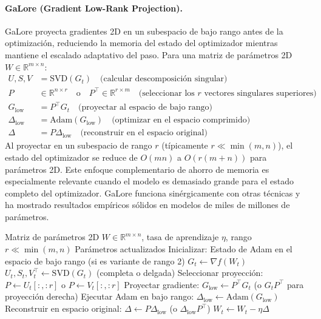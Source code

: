 \paragraph{GaLore (Gradient Low-Rank Projection).}
GaLore proyecta gradientes 2D en un subespacio de bajo rango antes de la optimización, reduciendo la memoria del estado del optimizador mientras mantiene el escalado adaptativo del paso. Para una matriz de parámetros 2D $W \in \mathbb{R}^{m \times n}$:
\begin{align}
U, S, V &= \text{SVD}(G_t) \quad\text{(calcular descomposición singular)} \\
P &\in \mathbb{R}^{n \times r} \quad\text{o} \quad P^\top \in \mathbb{R}^{r \times m} \quad\text{(seleccionar los $r$ vectores singulares superiores)} \\
G_{\text{low}} &= P^\top G_t \quad\text{(proyectar al espacio de bajo rango)} \\
\Delta_{\text{low}} &= \text{Adam}(G_{\text{low}}) \quad\text{(optimizar en el espacio comprimido)} \\
\Delta &= P \Delta_{\text{low}} \quad\text{(reconstruir en el espacio original)}
\end{align}
Al proyectar en un subespacio de rango $r$ (típicamente $r \ll \min(m,n)$), el estado del optimizador se reduce de $O(mn)$ a $O(r(m+n))$ para parámetros 2D. Este enfoque complementario de ahorro de memoria es especialmente relevante cuando el modelo es demasiado grande para el estado completo del optimizador. GaLore funciona sinérgicamente con otras técnicas y ha mostrado resultados empíricos sólidos en modelos de miles de millones de parámetros.

\begin{algorithm}[H]
\caption{GaLore (Gradient Low-Rank Projection)}
\label{alg:galore}
\begin{algorithmic}[1]
\Require Matriz de parámetros 2D $W \in \mathbb{R}^{m \times n}$, tasa de aprendizaje $\eta$, rango $r \ll \min(m,n)$
\Ensure Parámetros actualizados
\State Inicializar: Estado de Adam en el espacio de bajo rango (si es variante de rango 2)
    \State $G_t \gets \nabla f(W_t)$
      
        \State $U_t, S_t, V_t^\top \gets \text{SVD}(G_t)$ (completa o delgada)
        \State Seleccionar proyección: $P \gets U_t[:, :r]$ o $P \gets V_t[:, :r]$
    \EndIf
    \State Proyectar gradiente: $G_{\text{low}} \gets P^\top G_t$ (o $G_t P^\top$ para proyección derecha)
    \State Ejecutar Adam en bajo rango: $\Delta_{\text{low}} \gets \text{Adam}(G_{\text{low}})$
    \State Reconstruir en espacio original: $\Delta \gets P \Delta_{\text{low}}$ (o $\Delta_{\text{low}} P^\top$)
    \State $W_t \gets W_t - \eta \Delta$
\EndFor
\end{algorithmic}
\end{algorithm}


